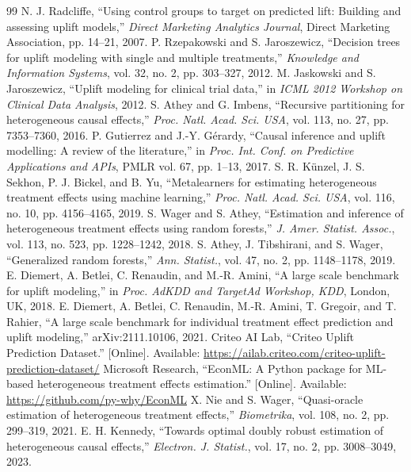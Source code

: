 \documentclass[conference]{IEEEtran}
\begin{document}
\begin{thebibliography}{99}
\footnotesize
{} N. J. Radcliffe, ``Using control groups to target on predicted lift: Building and assessing uplift models,'' \emph{Direct Marketing Analytics Journal}, Direct Marketing Association, pp. 14--21, 2007.
 P. Rzepakowski and S. Jaroszewicz, ``Decision trees for uplift modeling with single and multiple treatments,'' \emph{Knowledge and Information Systems}, vol. 32, no. 2, pp. 303--327, 2012.
 M. Jaskowski and S. Jaroszewicz, ``Uplift modeling for clinical trial data,'' in \emph{ICML 2012 Workshop on Clinical Data Analysis}, 2012.
 S. Athey and G. Imbens, ``Recursive partitioning for heterogeneous causal effects,'' \emph{Proc. Natl. Acad. Sci. USA}, vol. 113, no. 27, pp. 7353--7360, 2016.
 P. Gutierrez and J.-Y. G\'erardy, ``Causal inference and uplift modelling: A review of the literature,'' in \emph{Proc. Int. Conf. on Predictive Applications and APIs}, PMLR vol. 67, pp. 1--13, 2017.
 S. R. K\"unzel, J. S. Sekhon, P. J. Bickel, and B. Yu, ``Metalearners for estimating heterogeneous treatment effects using machine learning,'' \emph{Proc. Natl. Acad. Sci. USA}, vol. 116, no. 10, pp. 4156--4165, 2019.
 S. Wager and S. Athey, ``Estimation and inference of heterogeneous treatment effects using random forests,'' \emph{J. Amer. Statist. Assoc.}, vol. 113, no. 523, pp. 1228--1242, 2018.
 S. Athey, J. Tibshirani, and S. Wager, ``Generalized random forests,'' \emph{Ann. Statist.}, vol. 47, no. 2, pp. 1148--1178, 2019.
 E. Diemert, A. Betlei, C. Renaudin, and M.-R. Amini, ``A large scale benchmark for uplift modeling,'' in \emph{Proc. AdKDD and TargetAd Workshop, KDD}, London, UK, 2018.
 E. Diemert, A. Betlei, C. Renaudin, M.-R. Amini, T. Gregoir, and T. Rahier, ``A large scale benchmark for individual treatment effect prediction and uplift modeling,'' arXiv:2111.10106, 2021.
 Criteo AI Lab, ``Criteo Uplift Prediction Dataset.'' [Online]. Available: \url{https://ailab.criteo.com/criteo-uplift-prediction-dataset/}
 Microsoft Research, ``EconML: A Python package for ML-based heterogeneous treatment effects estimation.'' [Online]. Available: \url{https://github.com/py-why/EconML}
 X. Nie and S. Wager, ``Quasi-oracle estimation of heterogeneous treatment effects,'' \emph{Biometrika}, vol. 108, no. 2, pp. 299--319, 2021.
 E. H. Kennedy, ``Towards optimal doubly robust estimation of heterogeneous causal effects,'' \emph{Electron. J. Statist.}, vol. 17, no. 2, pp. 3008--3049, 2023.

\end{thebibliography}
\end{document}
